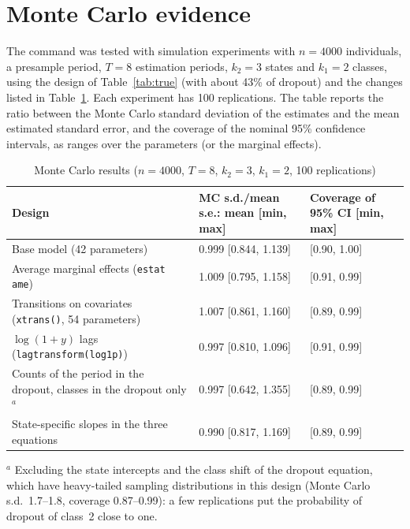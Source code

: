 \documentclass[11pt,a4paper]{article}
\newcommand{\cmd}[1]{\texttt{#1}}
\begin{document}
\section{Monte Carlo evidence}\label{sec:mc}

The command was tested with simulation experiments with $n=4000$ individuals, a presample period, $T=8$
estimation periods, $k_2=3$ states and $k_1=2$ classes, using the design of Table~\ref{tab:true} (with
about 43\% of dropout) and the changes listed in Table~\ref{tab:mc}. Each experiment has 100
replications. The table reports the ratio between the Monte Carlo standard deviation of the estimates
and the mean estimated standard error, and the coverage of the nominal 95\% confidence intervals, as
ranges over the parameters (or the marginal effects).

\begin{table}[h]
\centering\small
\caption{Monte Carlo results ($n=4000$, $T=8$, $k_2=3$, $k_1=2$, 100 replications)}\label{tab:mc}
\begin{tabularx}{\textwidth}{>{\raggedright\arraybackslash}p{5.6cm}XX}
\toprule
Design & MC s.d./mean s.e.: mean [min, max] & Coverage of 95\% CI [min, max]\\
\midrule
Base model (42 parameters) & 0.999 [0.844, 1.139] & [0.90, 1.00]\\
Average marginal effects (\cmd{estat ame}) & 1.009 [0.795, 1.158] & [0.91, 0.99]\\
Transitions on covariates (\cmd{xtrans()}, 54 parameters) & 1.007 [0.861, 1.160] & [0.89, 0.99]\\
$\log(1+y)$ lags (\cmd{lagtransform(log1p)}) & 0.997 [0.810, 1.096] & [0.91, 0.99]\\
Counts of the period in the dropout, classes in the dropout only$^a$ & 0.997 [0.642, 1.355] & [0.89, 0.99]\\
State-specific slopes in the three equations & 0.990 [0.817, 1.169] & [0.89, 0.99]\\
\bottomrule
\end{tabularx}

\smallskip
\begin{minipage}{\textwidth}\footnotesize
$^a$ Excluding the state intercepts and the class shift of the dropout equation, which have heavy-tailed
sampling distributions in this design (Monte Carlo s.d.\ 1.7--1.8, coverage 0.87--0.99): a few
replications put the probability of dropout of class~2 close to one.
\end{minipage}
\end{table}
\end{document}
